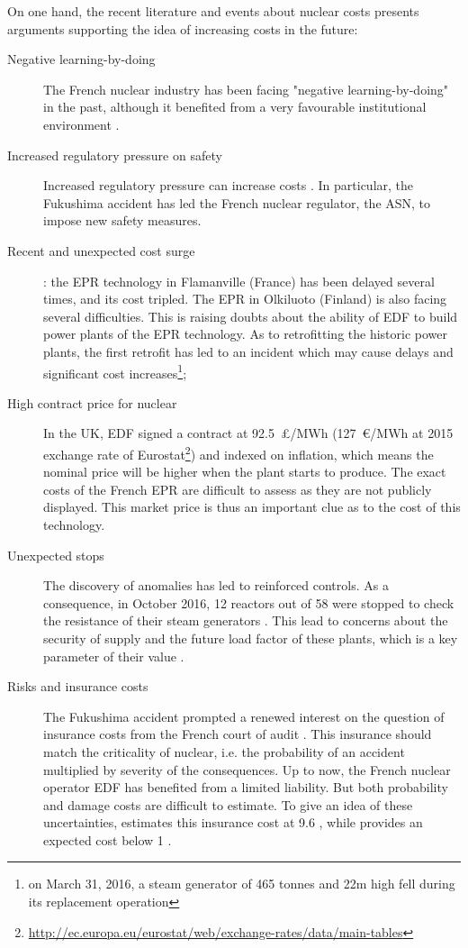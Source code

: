 On one hand, the recent literature and events about nuclear costs presents arguments supporting the idea of increasing costs in the future:
\begin{description}
	
	\item [Negative learning-by-doing] The French nuclear industry has been facing "negative learning-by-doing" in the past, although it benefited from a very favourable institutional environment \citep{Grubler2010}.
	
	\item [Increased regulatory pressure on safety] Increased regulatory pressure can increase costs \citep{Cooper2011}. In particular, the Fukushima accident has led the French nuclear regulator, the ASN, to impose new safety measures.
	
	\item [Recent and unexpected cost surge]: the EPR technology in Flamanville (France) has been delayed several times, and its cost tripled.
	The EPR in Olkiluoto (Finland) is also facing several difficulties.
	This is raising doubts about the ability of EDF to build power plants of the EPR technology.
	As to retrofitting the historic power plants, the first retrofit has led to an incident which may cause delays and significant cost increases\footnote{
		on March 31, 2016, a steam generator of 465 tonnes and 22m high fell during its replacement operation};
	
	\item [High contract price for nuclear] In the UK, EDF signed a contract at 92.5~\pounds/MWh (127~\euro/MWh at 2015 exchange rate of Eurostat\footnote{\url{http://ec.europa.eu/eurostat/web/exchange-rates/data/main-tables}}) and indexed on inflation, which means the nominal price will be higher when the plant starts to produce. The exact costs of the French EPR are difficult to assess as they are not publicly displayed. This market price is thus an important clue as to the cost of this technology.
	
	\item [Unexpected stops] The discovery of anomalies has led to reinforced controls. As a consequence, in October 2016, 12 reactors out of 58 were stopped to check the resistance of their steam generators \citep{Monicault2016}. This lead to concerns about the security of supply and the future load factor of these plants, which is a key parameter of their value \citep{IEA2015}.
	
	\item [Risks and insurance costs] The Fukushima accident prompted a renewed interest on the question of insurance costs from the French court of audit \citep{CourdesComptes2012}. This insurance should match the criticality of nuclear, i.e. the probability of an accident multiplied by severity of the consequences. Up to now, the French nuclear operator EDF has benefited from a limited liability. But both probability and damage costs are difficult to estimate. To give an idea of these uncertainties, \citet{Boccard2014} estimates this insurance cost at 9.6 \emwh, while \citet{Leveque2015} provides an expected cost below 1 \emwh. 
	

\end{description}
